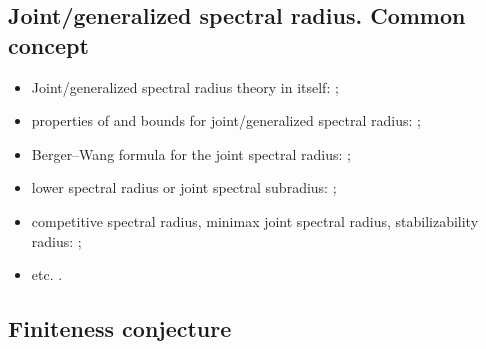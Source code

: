 \documentclass[a4paper,fleqn]{article}
\let\cite=\citep
\begin{document}
\subsection*{Joint/generalized spectral radius. Common concept}
\begin{itemize}
  \item Joint/generalized spectral radius theory in itself: \cite{AhmPar:CDC12,
          BKPW:LAA08, Blondel:LAA08, Bochi15, Breuillard2022, Cicone:ArXiv15,
          CMS:LAA21, CMMS:EJP23, Els:LAA95, Jungers:09, Jungers:LNCS13,
          Moeller15, MolReif:LAA14, MorSid:JEMS13, OgurMart:LAA14, Prot:FPM96:e,
          Prot:IZV97:e, Prot:FU98, RotaStr:IM60, ShulTur:JFA00, KisShulTur:20,
          KisShulTur:JMS22, ShulTur:ArXiv08, Strang03, Theys:PhD05,
          XuXiao:AJIFAC11};
  \item properties of and bounds for joint/generalized spectral radius:
        \cite{Alpin:MZ10, Breuillard2022, CJ:IJAMCS06, CJN:AISC15, Gil:UJMA19,
          GugProt:MC23, GS:MCRF20, HStr:LASP92, Koz:DEDS10, Koz:LAA10,
          Maesumi:TIC95, Maesumi:LAA96, MorSid:JEMS13, Morris:ADVM10,
          Peperko:LAA12, Wirth:MTNS04, Wirth:LAA05, XuAci:IEEETAC20, Zhou:AMC06};
  \item Berger--Wang formula for the joint spectral radius: \cite{BF:AIF21,
          Breuillard2022, Koz:LAA14, Morris:JFA12, Oregon-Reyes:JEPM20};
  \item lower spectral radius or joint spectral subradius:
        \cite{BochiMor:PLMS15, CJ:IJAMCS06, CJ:IJAMCS07, Czornik:LAA05,
          DekKui:JEMS11, GugMai:ArXiv24, Jungers:LAA12, Morris:LAA17,
          MP:DCDCA18};
  \item competitive spectral radius, minimax joint spectral radius, stabilizability radius: \cite{AGMM:ArXiv25, Dettmann:ArXiv25, DJM:SCL20, DZ:ArXiv25, AGM:ArXiv24, JunMas:SIAMJCO17, Koz:DCDSB19};
  \item etc. \cite{GugZen:LAA12, Koz:LAA09, Oreg-Reyes:MastThes18,
          Pascoe:IJM21}.
\end{itemize}

\subsection*{Finiteness conjecture}
\end{document}
